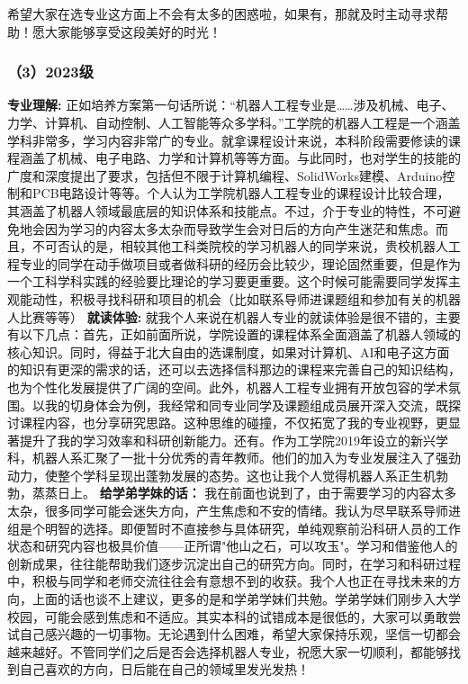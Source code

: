 \documentclass[11pt,oneside]{book}
\begin{document}
希望大家在选专业这方面上不会有太多的困惑啦，如果有，那就及时主动寻求帮助！愿大家能够享受这段美好的时光！

\subsubsection{（3）2023级}

\textbf{专业理解:}
	正如培养方案第一句话所说：“机器人工程专业是……涉及机械、电子、力学、计算机、自动控制、人工智能等众多学科。”工学院的机器人工程是一个涵盖学科非常多，学习内容非常广的专业。就拿课程设计来说，本科阶段需要修读的课程涵盖了机械、电子电路、力学和计算机等等方面。与此同时，也对学生的技能的广度和深度提出了要求，包括但不限于计算机编程、SolidWorks建模、Arduino控制和PCB电路设计等等。个人认为工学院机器人工程专业的课程设计比较合理，其涵盖了机器人领域最底层的知识体系和技能点。不过，介于专业的特性，不可避免地会因为学习的内容太多太杂而导致学生会对日后的方向产生迷茫和焦虑。而且，不可否认的是，相较其他工科类院校的学习机器人的同学来说，贵校机器人工程专业的同学在动手做项目或者做科研的经历会比较少，理论固然重要，但是作为一个工科学科实践的经验要比理论的学习要更重要。这个时候可能需要同学发挥主观能动性，积极寻找科研和项目的机会（比如联系导师进课题组和参加有关的机器人比赛等等）
 \textbf{就读体验:}
	就我个人来说在机器人专业的就读体验是很不错的，主要有以下几点：首先，正如前面所说，学院设置的课程体系全面涵盖了机器人领域的核心知识。同时，得益于北大自由的选课制度，如果对计算机、AI和电子这方面的知识有更深的需求的话，还可以去选择信科那边的课程来完善自己的知识结构，也为个性化发展提供了广阔的空间。此外，机器人工程专业拥有开放包容的学术氛围。以我的切身体会为例，我经常和同专业同学及课题组成员展开深入交流，既探讨课程内容，也分享研究思路。这种思维的碰撞，不仅拓宽了我的专业视野，更显著提升了我的学习效率和科研创新能力。还有。作为工学院2019年设立的新兴学科，机器人系汇聚了一批十分优秀的青年教师。他们的加入为专业发展注入了强劲动力，使整个学科呈现出蓬勃发展的态势。这也让我个人觉得机器人系正生机勃勃，蒸蒸日上。
 \textbf{给学弟学妹的话：}
	我在前面也说到了，由于需要学习的内容太多太杂，很多同学可能会迷失方向，产生焦虑和不安的情绪。我认为尽早联系导师进组是个明智的选择。即便暂时不直接参与具体研究，单纯观察前沿科研人员的工作状态和研究内容也极具价值——正所谓"他山之石，可以攻玉"。学习和借鉴他人的创新成果，往往能帮助我们逐步沉淀出自己的研究方向。同时，在学习和科研过程中，积极与同学和老师交流往往会有意想不到的收获。我个人也正在寻找未来的方向，上面的话也谈不上建议，更多的是和学弟学妹们共勉。学弟学妹们刚步入大学校园，可能会感到焦虑和不适应。其实本科的试错成本是很低的，大家可以勇敢尝试自己感兴趣的一切事物。无论遇到什么困难，希望大家保持乐观，坚信一切都会越来越好。不管同学们之后是否会选择机器人专业，祝愿大家一切顺利，都能够找到自己喜欢的方向，日后能在自己的领域里发光发热！
\end{document}
